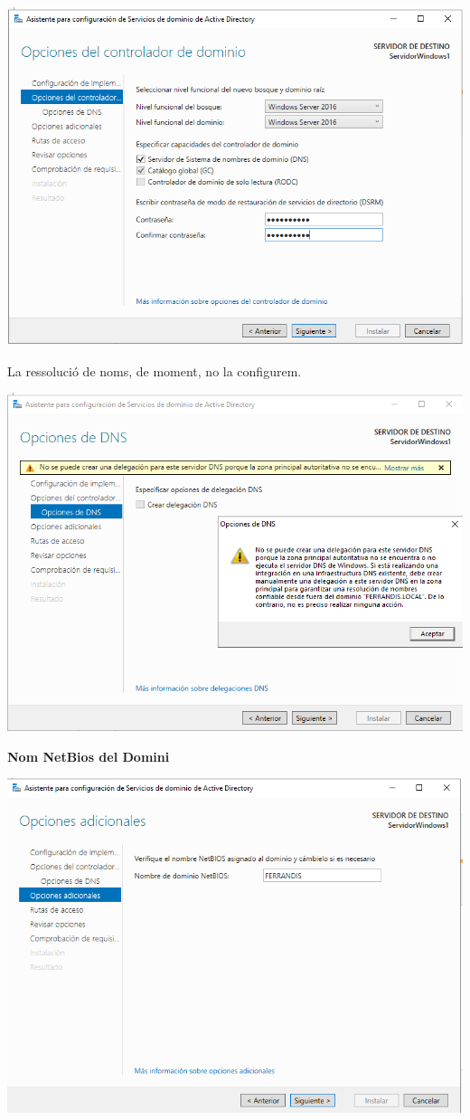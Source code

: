 \documentclass[
  a4paper,
]{article}
\begin{document}
\includegraphics{png/noubosc2.png}

La ressolució de noms, de moment, no la configurem.

\includegraphics{png/nodns.png}

\textbf{Nom NetBios del Domini}

\includegraphics{png/nomnetbiosdomini.png}
\end{document}
